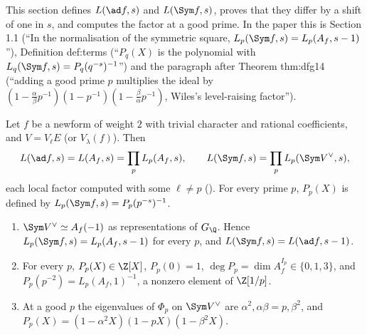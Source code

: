 This section defines $L(\ad f,s)$ and $L(\Sym f,s)$, proves that they differ by a shift of one in $s$, and computes the factor at a good prime. In the paper this
is Section 1.1 (``In the normalisation of the symmetric square, $L_p(\Sym f,s)=L_p(A_f,s-1)$''), Definition def:terms (``$P_q(X)$ is the polynomial with
$L_q(\Sym f,s)=P_q(q^{-s})^{-1}$'') and the paragraph after Theorem thm:dfg14 (``adding a good prime $p$ multiplies the ideal by
$(1-\frac\alpha\beta p^{-1})(1-p^{-1})(1-\frac\beta\alpha p^{-1})$, Wiles's level-raising factor'').

\begin{definition}\label{def:lfunctions:ad-sym}
Let $f$ be a newform of weight $2$ with trivial character and rational coefficients, and $V=V_\ell E$ (or $V_\lambda(f)$). Then
\[
L(\ad f,s)=L(A_f,s)=\prod_pL_p(A_f,s),\qquad L(\Sym f,s)=\prod_pL_p(\Sym V^\vee,s),
\]
each local factor computed with some $\ell\ne p$ (). For every prime $p$, $P_p(X)$ is defined by $L_p(\Sym f,s)=P_p(p^{-s})^{-1}$.
\end{definition}

\begin{proposition}\label{prop:lfunctions:ad-sym}
\begin{enumerate}[label=(\roman*)]
\item $\Sym V^\vee\simeq A_f(-1)$ as representations of $G_\Q$. Hence $L_p(\Sym f,s)=L_p(A_f,s-1)$ for every $p$, and $L(\Sym f,s)=L(\ad f,s-1)$.
\item For every $p$, $P_p(X)\in\Z[X]$, $P_p(0)=1$, $\deg P_p=\dim A_f^{I_p}\in\{0,1,3\}$, and $P_p(p^{-2})=L_p(A_f,1)^{-1}$, a nonzero element of $\Z[1/p]$.
\item At a good $p$ the eigenvalues of $\Phi_p$ on $\Sym V^\vee$ are $\alpha^2,\alpha\beta=p,\beta^2$, and $P_p(X)=(1-\alpha^2X)(1-pX)(1-\beta^2X)$.
\end{enumerate}
\end{proposition}

